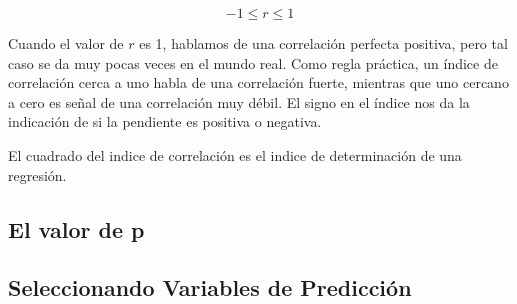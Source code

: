\documentclass[letterpaper, spanish, 11pt]{report}
\begin{document}
\[ -1 \leq r \leq 1\]
	
Cuando el valor de $r$ es 1, hablamos de una correlación perfecta positiva, pero tal caso se da muy pocas veces en el mundo real. Como regla práctica, un índice de correlación cerca a uno habla de una correlación fuerte, mientras que uno cercano a cero es señal de una correlación muy débil. El signo en el índice nos da la indicación de si la pendiente es positiva o negativa. 

El cuadrado del indice de correlación es el indice de determinación de una regresión.  	
	
\subsection{El valor de p}

\subsection{Seleccionando Variables de Predicción}


\pagebreak

\end{document}
